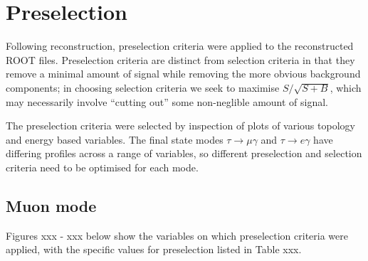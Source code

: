 \documentclass[12pt,a4paper]{article} %
\begin{document}
\pagebreak


\section{Preselection}

Following reconstruction, preselection criteria were applied to the reconstructed ROOT files. Preselection criteria are distinct from selection criteria in that they remove a minimal amount of signal while removing the more obvious background components; in choosing selection criteria we seek to maximise $S/\sqrt{S+B}$, which may necessarily involve ``cutting out'' some non-neglible amount of signal.

The preselection criteria were selected by inspection of plots of various topology and energy based variables.  The final state modes $\tau\to\mu\gamma$ and $\tau\to e\gamma$ have differing profiles across a range of variables, so different preselection and selection criteria need to be optimised for each mode. 


\subsection{Muon mode}
Figures xxx - xxx below show the variables on which preselection criteria were applied, with the specific values for preselection listed in Table xxx.
\end{document}
